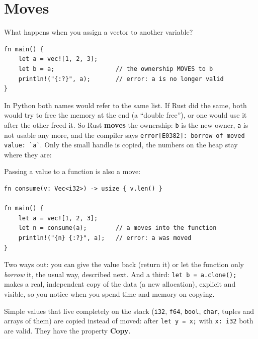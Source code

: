 \section*{Moves}
What happens when you assign a vector to another variable?
\begin{verbatim}
fn main() {
    let a = vec![1, 2, 3];
    let b = a;                 // the ownership MOVES to b
    println!("{:?}", a);       // error: a is no longer valid
}
\end{verbatim}
In Python both names would refer to the same list. If Rust did the same, both would try to free the memory at the end (a ``double free''), or one would use it after the other freed it. So Rust \textbf{moves} the ownership: \verb!b! is the new owner, \verb!a! is not usable any more, and the compiler says \verb!error[E0382]: borrow of moved value: `a`!. Only the small handle is copied, the numbers on the heap stay where they are:
\begin{center}
\end{center}
Passing a value to a function is also a move:
\begin{verbatim}
fn consume(v: Vec<i32>) -> usize { v.len() }

fn main() {
    let a = vec![1, 2, 3];
    let n = consume(a);        // a moves into the function
    println!("{n} {:?}", a);   // error: a was moved
}
\end{verbatim}
Two ways out: you can give the value back (return it) or let the function only \emph{borrow} it, the usual way, described next. And a third: \verb!let b = a.clone();! makes a real, independent copy of the data (a new allocation), explicit and visible, so you notice when you spend time and memory on copying.
\begin{keyidea}
Simple values that live completely on the stack (\verb!i32!, \verb!f64!, \verb!bool!, \verb!char!, tuples and arrays of them) are copied instead of moved: after \verb!let y = x;! with \verb!x: i32! both are valid. They have the property \textbf{Copy}.
\end{keyidea}

